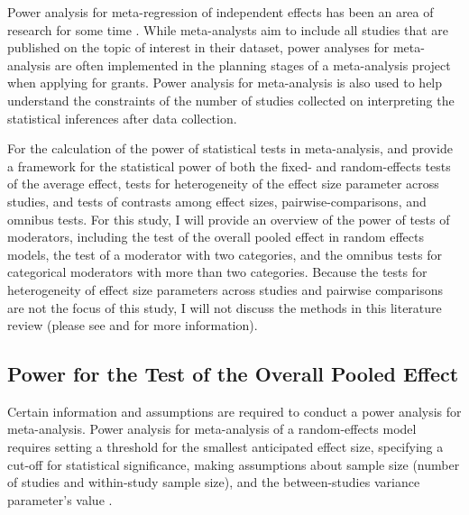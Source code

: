 Power analysis for meta-regression of independent effects has been an area of research for some time \autocite{hedges2001, hedges2004, valentine2010, jackson2017}. While meta-analysts aim to include all studies that are published on the topic of interest in their dataset, power analyses for meta-analysis are often implemented in the planning stages of a meta-analysis project when applying for grants. Power analysis for meta-analysis is also used to help understand the constraints of the number of studies collected on interpreting the statistical inferences after data collection. 

For the calculation of the power of statistical tests in meta-analysis, \textcite{hedges2001} and \textcite{hedges2004} provide a framework for the statistical power of both the fixed- and random-effects tests of the average effect, tests for heterogeneity of the effect size parameter across studies, and tests of contrasts among effect sizes, pairwise-comparisons, and omnibus tests. For this study, I will provide an overview of the power of tests of moderators, including the test of the overall pooled effect in random effects models, the test of a moderator with two categories, and the omnibus tests for categorical moderators with more than two categories. Because the tests for heterogeneity of effect size parameters across studies and pairwise comparisons are not the focus of this study, I will not discuss the methods in this literature review (please see \textcite{hedges2001} and \textcite{hedges2004} for more information). 
   
\subsection{Power for the Test of the Overall Pooled Effect}

Certain information and assumptions are required to conduct a power analysis for meta-analysis. Power analysis for meta-analysis of a random-effects model requires setting a threshold for the smallest anticipated effect size, specifying a cut-off for statistical significance, making assumptions about sample size (number of studies and within-study sample size), and the between-studies variance parameter's value \autocite{hedges2001}. 

